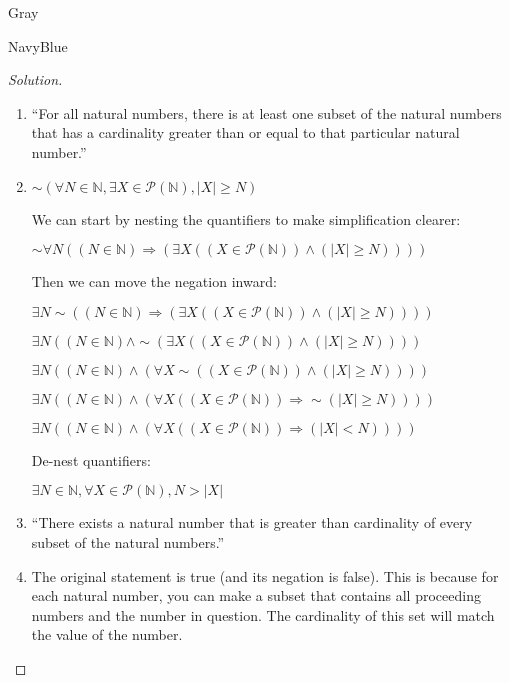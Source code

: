 \documentclass[12pt]{amsart}
\theoremstyle{named}
\newenvironment{soln}
{\begin{color}{Gray}\begin{framed}\begin{color}{NavyBlue}\begin{proof}[Solution]
\doublespacing}
{\end{proof}\end{color}\end{framed}\end{color}}
\theoremstyle{definition}
\newcommand{\N}{\mathbb N}
\begin{document}
\begin{soln}
	\phantom{ }

	\begin{enumerate}
		\item ``For all natural numbers, there is at least one subset of the 
		natural numbers that has a cardinality greater than or equal to that
		particular natural number.''
		

		\item $\sim (\forall N\in\N,\exists X\in\mathscr P(\N),|X|\geq N)$
		
		\noindent We can start by nesting the quantifiers to make simplification clearer:
		
		\noindent $\sim \forall N ((N \in \mathbb N) \Rightarrow (\exists X((X \in \mathscr P(\N)) \land (|X| \geq N))))$
		
		\noindent Then we can move the negation inward: 

		\noindent $\exists N \sim ((N \in \mathbb N) \Rightarrow (\exists X((X \in \mathscr P(\N)) \land (|X| \geq N))))$

		\noindent $\exists N ((N \in \mathbb N) \land \sim (\exists X((X \in \mathscr P(\N)) \land (|X| \geq N))))$

		\noindent $\exists N ((N \in \mathbb N) \land (\forall X \sim((X \in \mathscr P(\N)) \land (|X| \geq N))))$

		\noindent $\exists N ((N \in \mathbb N) \land (\forall X ((X \in \mathscr P(\N)) \Rightarrow \sim (|X| \geq N))))$

		\noindent $\exists N ((N \in \mathbb N) \land (\forall X ((X \in \mathscr P(\N)) \Rightarrow (|X| < N))))$

		\noindent De-nest quantifiers:

		\noindent $\exists N \in \mathbb N, \forall X \in \mathscr P (\mathbb N),N > |X|$


		\item ``There exists a natural number that is greater than cardinality of every subset
		of the natural numbers.''

		\item The original statement is true (and its negation is false). This
		is because for each natural number, you can make a subset that contains
		all proceeding numbers and the number in question. The cardinality of
		this set will match the value of the number. 

		\phantom{ }

	\end{enumerate}
\end{soln}
\end{document}
